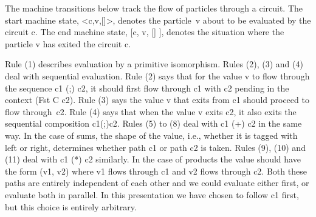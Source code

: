 \documentclass[preprint]{sigplanconf}
\begin{document}
\begin{scriptsize}
\end{scriptsize}
The machine transitions below track the flow of particles through a
circuit. The start machine state, {{<c,v,[]>}}, denotes the
particle~{{v}} about to be evaluated by the circuit {{c}}. The end
machine state, {{[c, v, [] ]}}, denotes the situation where the particle
{{v}} has exited the circuit {{c}}.

\begin{scriptsize}
\end{scriptsize}
Rule (1) describes evaluation by a primitive isomorphism. Rules (2), (3) and
(4) deal with sequential evaluation. Rule (2) says that for the value {{v}}
to flow through the sequence {{c1 (;) c2}}, it should first flow through
{{c1}} with {{c2}} pending in the context ({{Fst C c2}}). Rule (3) says the
value {{v}} that exits from {{c1}} should proceed to flow
through~{{c2}}. Rule (4) says that when the value {{v}} exits {{c2}}, it also
exits the sequential composition {{c1(;)c2}}. Rules (5) to (8) deal with 
{{c1 (+) c2}} in the same way. In the case of sums, the shape of the value,
i.e., whether it is tagged with {{left}} or {{right}}, determines whether
path {{c1}} or path {{c2}} is taken. Rules (9), (10) and (11) deal with 
{{c1 (*) c2}} similarly. In the case of products the value should have the
form {{(v1, v2)}} where {{v1}} flows through {{c1}} and {{v2}} flows through
{{c2}}. Both these paths are entirely independent of each other and we could
evaluate either first, or evaluate both in parallel. In this presentation we
have chosen to follow {{c1}} first, but this choice is entirely arbitrary.
\end{document}
